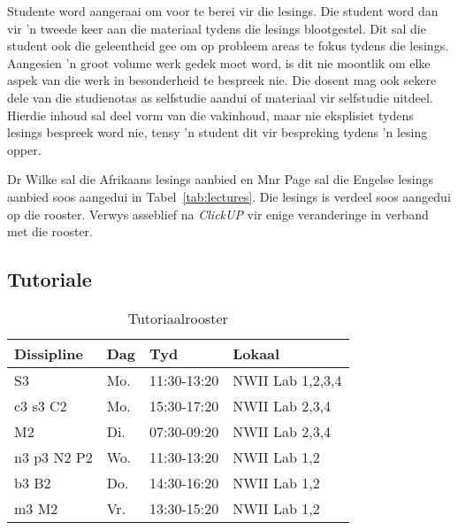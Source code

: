 	Studente word aangeraai om voor te berei vir die lesings. Die
        student word dan vir 'n tweede keer aan die materiaal tydens
        die lesings blootgestel. Dit sal die student ook die
        geleentheid gee om op probleem areas te fokus tydens die
        lesings. Aangesien 'n groot volume werk gedek moet word, is
        dit nie moontlik om elke aspek van die werk in besonderheid te
        bespreek nie.
        Die dosent mag ook sekere dele van die studienotas as
        selfstudie aandui of materiaal vir selfstudie uitdeel. Hierdie
        inhoud sal deel vorm van die vakinhoud, maar nie eksplisiet
        tydens lesings bespreek word nie, tensy 'n student dit vir
        bespreking tydens 'n lesing opper.
                
	Dr Wilke sal die Afrikaans lesings aanbied en Mnr Page sal die
        Engelse lesings aanbied soos aangedui in
        Tabel~\ref{tab:lectures}.  Die lesings is verdeel soos
        aangedui op die rooster.  Verwys asseblief na \textit{ClickUP}
        vir enige veranderinge in verband met die rooster.
        
       \subsection{Tutoriale}
        \begin{table}[!h]
            \begin{center}
            \begin{tabular}{|l|l|l|l|}
                \hline
                {\bf Dissipline} & {\bf Dag} & {\bf Tyd} & {\bf Lokaal} \\
                \hline
                S3          & Mo.   & 11:30-13:20 & NWII Lab 1,2,3,4 \\
                c3 s3 C2    & Mo.   & 15:30-17:20 & NWII Lab 2,3,4 \\
                M2          & Di.  & 07:30-09:20 & NWII Lab 2,3,4 \\
                n3 p3 N2 P2 & Wo.   & 11:30-13:20 & NWII Lab 1,2 \\
                b3 B2       & Do. & 14:30-16:20 & NWII Lab 1,2 \\
                m3 M2       & Vr.   & 13:30-15:20 & NWII Lab 1,2 \\
                \hline
            \end{tabular}
            \caption{Tutoriaalrooster}
            \label{tab:tutorials}
            \end{center}
        \end{table}
        
